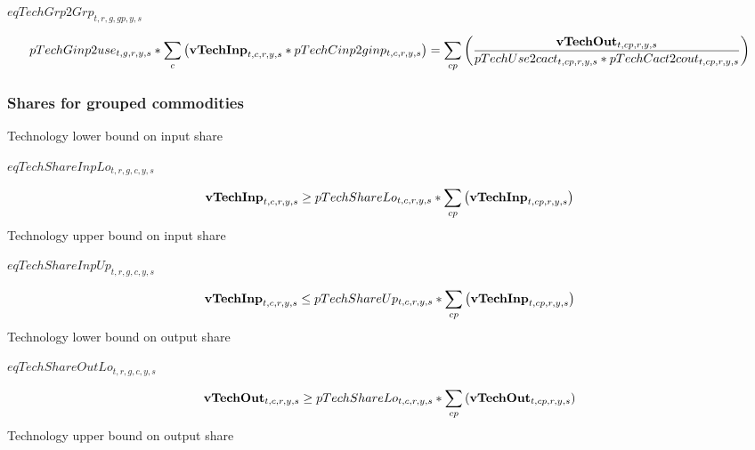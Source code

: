 \documentclass{article}
\begin{document}
$eqTechGrp2Grp_{t,r,g,gp,y,s}$





\begin{dmath}
pTechGinp2use_{t,g,r,y,s}*\sum_{c}{\left({\bf vTechInp}_{t,c,r,y,s}*pTechCinp2ginp_{t,c,r,y,s}\right)}  =  \sum_{cp}{\left(\frac{{\bf vTechOut}_{t,cp,r,y,s}}{pTechUse2cact_{t,cp,r,y,s}*pTechCact2cout_{t,cp,r,y,s}}\right)}
\end{dmath}
\subsubsection*{Shares for grouped commodities}
Technology lower bound on input share







$eqTechShareInpLo_{t,r,g,c,y,s}$





\begin{dmath}
{\bf vTechInp}_{t,c,r,y,s}  \ge  pTechShareLo_{t,c,r,y,s}*\sum_{cp}{\left({\bf vTechInp}_{t,cp,r,y,s}\right)}
\end{dmath}
Technology upper bound on input share







$eqTechShareInpUp_{t,r,g,c,y,s}$





\begin{dmath}
{\bf vTechInp}_{t,c,r,y,s}  \le  pTechShareUp_{t,c,r,y,s}*\sum_{cp}{\left({\bf vTechInp}_{t,cp,r,y,s}\right)}
\end{dmath}
Technology lower bound on output share







$eqTechShareOutLo_{t,r,g,c,y,s}$





\begin{dmath}
{\bf vTechOut}_{t,c,r,y,s}  \ge  pTechShareLo_{t,c,r,y,s}*\sum_{cp}{\left({\bf vTechOut}_{t,cp,r,y,s}\right)}
\end{dmath}
Technology upper bound on output share
\end{document}
